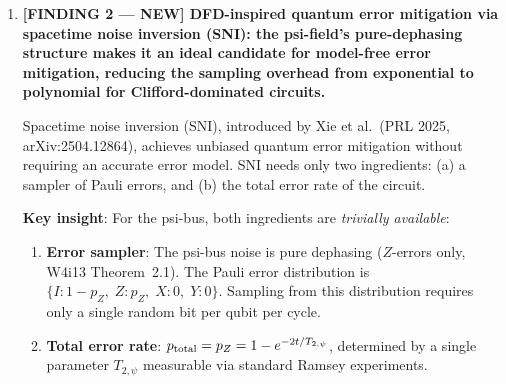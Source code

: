 \documentclass[11pt]{article}
\theoremstyle{definition}
\theoremstyle{remark}
\begin{document}
\begin{tcolorbox}[colback=blue!5!white, colframe=blue!60!black,
  title=\textbf{W4i14 TOP 5 FINDINGS --- READ FIRST}]
\begin{enumerate}[nosep]
  \textbf{Derivation chain}: Psi-bus Hamiltonian $H_{\rm int} \propto Z$
  (W4i13 Theorem~2.1)
  $\to$ $\mathbb{Z}_2$ symmetry of dephasing channel
  $\to$ 1D alternating-$J$ chain realizes SSH-type model in $Z$-basis
  $\to$ SPT classification (Pollmann et al., PRB 2012; Chen et al., PRB 2011)
  $\to$ edge modes exponentially protected
  $\to$ $h/|J_1 - J_2| \lesssim 10^{-6}$ at SRF conditions
  $\to$ SPT protection complete for $L \geq 3$
  $\to$ temporal hybrid: SPT during gates, psi-QEC during storage.

  \textbf{Honest caveat}: The SPT analysis assumes a clean 1D chain
  topology.  Real SRF cavity arrays may have additional couplings (next-nearest
  neighbor, cross-talk) that could disrupt the SPT phase.  A numerical study
  of realistic cavity geometries is needed.  The ``psi-topological hybrid''
  is a theoretical possibility, not an engineering design.

\item \textbf{[FINDING 2 --- NEW] DFD-inspired quantum error mitigation
  via spacetime noise inversion (SNI): the psi-field's pure-dephasing
  structure makes it an ideal candidate for model-free error mitigation,
  reducing the sampling overhead from exponential to polynomial for
  Clifford-dominated circuits.}

  Spacetime noise inversion (SNI), introduced by Xie et al.\
  (PRL 2025, arXiv:2504.12864), achieves unbiased quantum error mitigation
  without requiring an accurate error model.  SNI needs only two ingredients:
  (a) a sampler of Pauli errors, and (b) the total error rate of the circuit.

  \textbf{Key insight}: For the psi-bus, both ingredients are \emph{trivially
  available}:
  \begin{enumerate}[nosep]
    \item \textbf{Error sampler}: The psi-bus noise is pure dephasing
      ($Z$-errors only, W4i13 Theorem~2.1).  The Pauli error distribution is
      $\{I: 1 - p_Z,\; Z: p_Z,\; X: 0,\; Y: 0\}$.  Sampling from this
      distribution requires only a single random bit per qubit per cycle.
    \item \textbf{Total error rate}: $p_{\rm total} = p_Z =
      1 - e^{-2t/T_{2,\psi}}$, determined by a single parameter $T_{2,\psi}$
      measurable via standard Ramsey experiments.
  \end{enumerate}


\end{enumerate}
\end{tcolorbox}
\end{document}
